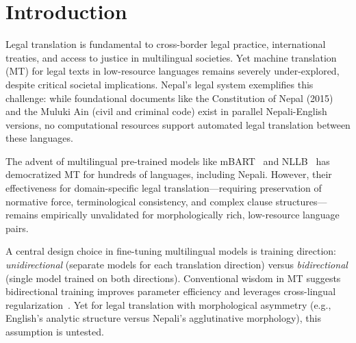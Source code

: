 \documentclass[manuscript, screen, review]{acmart}
\begin{document}

\maketitle

\section{Introduction}
\label{sec:intro}

Legal translation is fundamental to cross-border legal practice, international treaties, and access to justice in multilingual societies. Yet machine translation (MT) for legal texts in low-resource languages remains severely under-explored, despite critical societal implications. Nepal's legal system exemplifies this challenge: while foundational documents like the Constitution of Nepal (2015) and the Muluki Ain (civil and criminal code) exist in parallel Nepali-English versions, no computational resources support automated legal translation between these languages.

The advent of multilingual pre-trained models like mBART~\cite{liu2020multilingual} and NLLB~\cite{nllb2022} has democratized MT for hundreds of languages, including Nepali. However, their effectiveness for domain-specific legal translation—requiring preservation of normative force, terminological consistency, and complex clause structures—remains empirically unvalidated for morphologically rich, low-resource language pairs.

A central design choice in fine-tuning multilingual models is training direction: \textit{unidirectional} (separate models for each translation direction) versus \textit{bidirectional} (single model trained on both directions). Conventional wisdom in MT suggests bidirectional training improves parameter efficiency and leverages cross-lingual regularization~\cite{johnson2017google}. Yet for legal translation with morphological asymmetry (e.g., English's analytic structure versus Nepali's agglutinative morphology), this assumption is untested.
\end{document}
